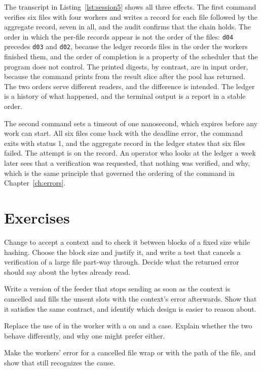 The transcript in Listing~\ref{lst:session5} shows all three effects. The first command verifies six files with four workers and writes a record for each file followed by the aggregate record, seven in all, and the audit confirms that the chain holds. The order in which the per-file records appear is not the order of the files: \texttt{d04} precedes \texttt{d03} and \texttt{d02}, because the ledger records files in the order the workers finished them, and the order of completion is a property of the scheduler that the program does not control. The printed digests, by contrast, are in input order, because the command prints from the result slice after the pool has returned. The two orders serve different readers, and the difference is intended. The ledger is a history of what happened, and the terminal output is a report in a stable order.

The second command sets a timeout of one nanosecond, which expires before any work can start. All six files come back with the deadline error, the command exits with status 1, and the aggregate record in the ledger states that six files failed. The attempt is on the record. An operator who looks at the ledger a week later sees that a verification was requested, that nothing was verified, and why, which is the same principle that governed the ordering of the  command in Chapter~\ref{ch:errors}.

\section*{Exercises}

\begin{exercise}
Change  to accept a context and to check it between blocks of a fixed size while hashing. Choose the block size and justify it, and write a test that cancels a verification of a large file part-way through. Decide what the returned error should say about the bytes already read.
\end{exercise}

\begin{exercise}
Write a version of the feeder that stops sending as soon as the context is cancelled and fills the unsent slots with the context's error afterwards. Show that it satisfies the same contract, and identify which design is easier to reason about.
\end{exercise}

\begin{exercise}
Replace the use of  in the worker with a  on  and a  case. Explain whether the two behave differently, and why one might prefer either.
\end{exercise}

\begin{exercise}
Make the workers' error for a cancelled file wrap  or  with the path of the file, and show that  still recognizes the cause.
\end{exercise}
